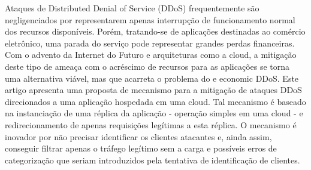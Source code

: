 
Ataques de Distributed Denial of Service (DDoS) frequentemente são negligenciados por representarem apenas interrupção de funcionamento normal dos recursos disponíveis. Porém, tratando-se de aplicações destinadas ao comércio eletrônico, uma parada do serviço pode representar grandes perdas financeiras. Com o advento da Internet do Futuro e arquiteturas como a cloud, a mitigação deste tipo de ameaça com o acréscimo de recursos para as aplicações se torna uma alternativa viável, mas que acarreta o problema do e economic DDoS. Este artigo apresenta uma proposta de mecanismo para a mitigação de ataques DDoS direcionados a uma aplicação hospedada em uma cloud. Tal mecanismo é baseado na instanciação de uma réplica da aplicação - operação simples em uma cloud - e redirecionamento de apenas requisições legítimas a esta réplica. O mecanismo é inovador por não precisar identificar os clientes atacantes e, ainda assim, conseguir filtrar apenas o tráfego legítimo sem a carga e possíveis erros de categorização que seriam introduzidos pela tentativa de identificação de clientes.
